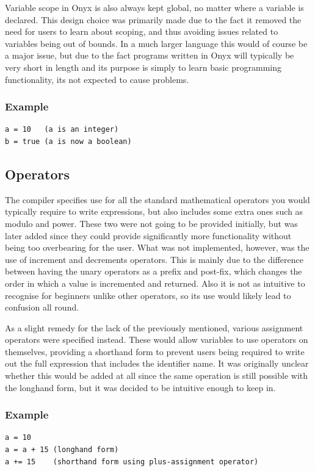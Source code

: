 \documentclass[
]{report}
\begin{document}
Variable scope in Onyx is also always kept global, no matter where a
variable is declared. This design choice was primarily made due to the
fact it removed the need for users to learn about scoping, and thus
avoiding issues related to variables being out of bounds. In a much
larger language this would of course be a major issue, but due to the
fact programs written in Onyx will typically be very short in length and
its purpose is simply to learn basic programming functionality, its not
expected to cause problems.

\subsubsection{Example}
\begin{verbatim}
a = 10   (a is an integer)
b = true (a is now a boolean)
\end{verbatim}

\subsection{Operators}
The compiler specifies use for all the standard mathematical operators
you would typically require to write \glspl{expression}, but also includes some
extra ones such as modulo and power. These two were not going to be
provided initially, but was later added since they could provide
significantly more functionality without being too overbearing for the
user. What was not implemented, however, was the use of increment and
decrements operators. This is mainly due to the difference between
having the unary operators as a prefix and post-fix, which changes the
order in which a value is incremented and returned. Also it is not as
intuitive to recognise for beginners unlike other operators, so its use
would likely lead to confusion all round.

As a slight remedy for the lack of the previously mentioned, various
assignment operators were specified instead. These would allow variables
to use operators on themselves, providing a shorthand form to prevent
users being required to write out the full \gls{expression} that includes the
\gls{identifier} name. It was originally unclear whether this would be added
at all since the same operation is still possible with the longhand
form, but it was decided to be intuitive enough to keep in.

\subsubsection{Example}
\begin{verbatim}
a = 10
a = a + 15 (longhand form)
a += 15    (shorthand form using plus-assignment operator)
\end{verbatim}
\end{document}
